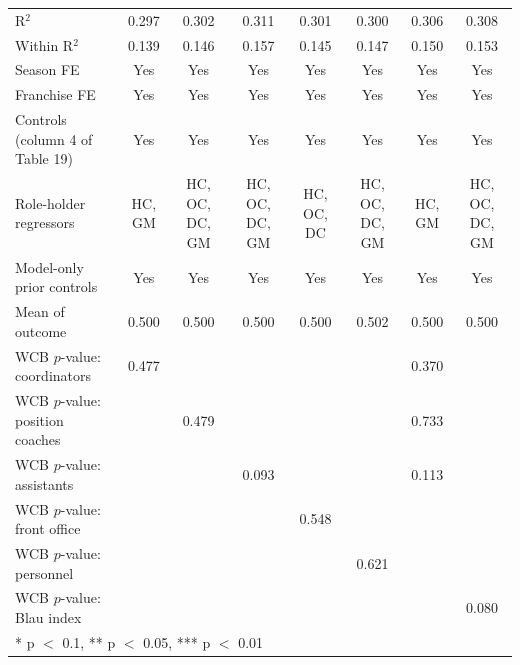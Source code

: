 \begin{table}[H]
{\begin{tabular}[t]{lccccccc}
R$^2$ & 0.297 & 0.302 & 0.311 & 0.301 & 0.300 & 0.306 & 0.308\\
Within R$^2$ & 0.139 & 0.146 & 0.157 & 0.145 & 0.147 & 0.150 & 0.153\\
Season FE & Yes & Yes & Yes & Yes & Yes & Yes & Yes\\
Franchise FE & Yes & Yes & Yes & Yes & Yes & Yes & Yes\\
Controls (column 4 of Table 19) & Yes & Yes & Yes & Yes & Yes & Yes & Yes\\
Role-holder regressors & HC, GM & HC, OC, DC, GM & HC, OC, DC, GM & HC, OC, DC & HC, OC, DC, GM & HC, GM & HC, OC, DC, GM\\
Model-only prior controls & Yes & Yes & Yes & Yes & Yes & Yes & Yes\\
Mean of outcome & 0.500 & 0.500 & 0.500 & 0.500 & 0.502 & 0.500 & 0.500\\
WCB $p$-value: coordinators & 0.477 &  &  &  &  & 0.370 & \\
WCB $p$-value: position coaches &  & 0.479 &  &  &  & 0.733 & \\
WCB $p$-value: assistants &  &  & 0.093 &  &  & 0.113 & \\
WCB $p$-value: front office &  &  &  & 0.548 &  &  & \\
WCB $p$-value: personnel &  &  &  &  & 0.621 &  & \\
WCB $p$-value: Blau index &  &  &  &  &  &  & 0.080\\
\bottomrule
\multicolumn{8}{l}{\rule{0pt}{1em}* p $<$ 0.1, ** p $<$ 0.05, *** p $<$ 0.01}\\
\end{tabular}}
\end{table}

